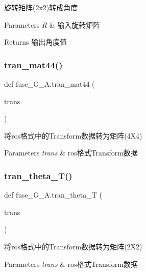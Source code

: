 旋转矩阵(2x2)转成角度 


\begin{DoxyParams}{Parameters}
{\em R} & 输入旋转矩阵\\
\hline
\end{DoxyParams}
\begin{DoxyReturn}{Returns}
输出角度值 
\end{DoxyReturn}
\mbox{\label{namespacefuse___g___a_aebc43ce6f276fb2bbbf7689d12b37589}} 
\subsubsection{\texorpdfstring{tran\+\_\+mat44()}{tran\_mat44()}}
{\footnotesize\ttfamily def fuse\+\_\+\+G\+\_\+\+A.\+tran\+\_\+mat44 (\begin{DoxyParamCaption}\item[{}]{trans }\end{DoxyParamCaption})}



将ros格式中的\+Transform数据转为矩阵(4\+X4) 


\begin{DoxyParams}{Parameters}
{\em trans} & ros格式\+Transform数据 \\
\hline
\end{DoxyParams}
\mbox{\label{namespacefuse___g___a_afe710c875e91776f6ae39f3c9e73798a}} 
\subsubsection{\texorpdfstring{tran\+\_\+theta\+\_\+\+T()}{tran\_theta\_T()}}
{\footnotesize\ttfamily def fuse\+\_\+\+G\+\_\+\+A.\+tran\+\_\+theta\+\_\+T (\begin{DoxyParamCaption}\item[{}]{trans }\end{DoxyParamCaption})}



将ros格式中的\+Transform数据转为矩阵(2\+X2) 


\begin{DoxyParams}{Parameters}
{\em trans} & ros格式\+Transform数据 \\
\hline
\end{DoxyParams}


